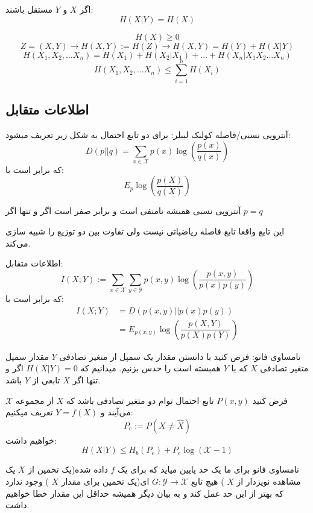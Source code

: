 \begin{theorem}
اگر
$X$
و
$Y$
مستقل باشند:
$$H(X|Y) = H(X)$$
\end{theorem}
\begin{theorem}
$$H(X) \geq 0$$
$$Z = (X, Y) \rightarrow H(X, Y) := H(Z) \rightarrow H(X, Y) = H(Y) + H(X|Y) $$
$$H(X_1, X_2, \dots X_n) = H(X_1) + H(X_2 | X_1) + \dots + H(X_n | X_1 X_2 \dots X_n)$$
$$H(X_1, X_2, \dots X_n) \leq \sum_{i = 1}^{n} H(X_i)$$
\end{theorem}
\subsection{اطلاعات متقابل}
\begin{definition}
آنتروپی نسبی/فاصله کولبک لیبلر: برای دو تابع احتمال به شکل زیر تعریف میشود:
$$
D(p||q) = \sum_{x \in \mathcal{X}} p(x) \log(\dfrac{p(x)}{q(x)})
$$
که برابر است با:
$$E_p \log(\dfrac{p(X)}{q(X)})$$
\end{definition}
\begin{theorem}
آنتروپی نسبی همیشه نامنفی است و برابر صفر است اگر و تنها اگر
$p = q$
\end{theorem}
این تابع واقعا تابع فاصله ریاضیاتی نیست ولی تفاوت بین دو توزیع را شبیه سازی می‌کند.

\begin{definition}
اطلاعات متفابل:
$$I(X; Y) := \sum_{x \in \mathcal{X}} \sum_{y \in \mathcal{Y}} p(x, y) \log(\dfrac{p(x, y)}{p(x)p(y)})$$
که برابر است با:
\begin{align*}
    I(X;Y) &= D(p(x, y) || p(x)p(y))
    \\
    &= E_{p(x, y)} \log(\dfrac{p(X, Y)}{p(X)p(Y)})
\end{align*}
\end{definition}
نامساوی فانو: فرض کنید با دانستن مقدار یک سمپل از متغیر تصادفی
$Y$
مقدار سمپل متغیر تصادفی
$X$
که با
$Y$
همبسته است را حدس بزنیم. میدانیم که
$H(X|Y) = 0$
اگر و تنها اگر
$X$
تابعی از
$Y$
باشد. 
\begin{theorem}[
	فانو
	]
فرض کنید
$P(x, y)$
تابع احتمال توام دو متغیر تصادفی باشد که
$X$
از مجموعه
$\mathcal{X}$
می‌آیند و
$Y = f(X)$
تعریف میکنیم:
$$P_e := P(X \neq \hat{X})$$
خواهیم داشت:
$$H(X|Y) \leq H_b(P_e) + P_e \log(\mathcal{X} - 1)$$
\end{theorem}
\begin{remark}
نامساوی فانو برای ما یک حد پایین میاید که برای یک
$f$
داده شده(یک تخمین از
$X$
 یک مشاهده نویزدار از
$X$
) هیچ تابع
$G:\mathcal{Y} \rightarrow \mathcal{X}$
ای(یک تخمین برای مقدار
$X$
) وجود ندارد که بهتر از این حد عمل کند و به بیان دیگر همیشه حداقل این مقدار خطا خواهیم داشت.
\end{remark}
